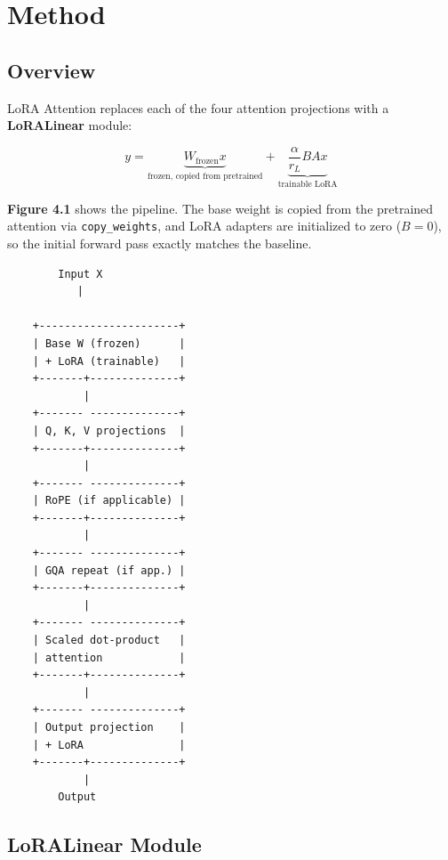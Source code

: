 \section{Method}

\subsection{Overview}

LoRA Attention replaces each of the four attention projections with a 
\textbf{LoRALinear} module:

\[
y = \underbrace{W_\text{frozen} x}_{\text{frozen, copied from pretrained}} + 
    \underbrace{\frac{\alpha}{r_L} B A x}_{\text{trainable LoRA}}
\tag{4.1}
\]

\textbf{Figure 4.1} shows the pipeline. The base weight is copied from the 
pretrained attention via \texttt{copy\_weights}, and LoRA adapters are initialized 
to zero ($B = 0$), so the initial forward pass exactly matches the baseline.

\begin{lstlisting}
        Input X
           |
            
    +----------------------+
    | Base W (frozen)      |
    | + LoRA (trainable)   |
    +-------+--------------+
            |
    +------- --------------+
    | Q, K, V projections  |
    +-------+--------------+
            |
    +------- --------------+
    | RoPE (if applicable) |
    +-------+--------------+
            |
    +------- --------------+
    | GQA repeat (if app.) |
    +-------+--------------+
            |
    +------- --------------+
    | Scaled dot-product   |
    | attention            |
    +-------+--------------+
            |
    +------- --------------+
    | Output projection    |
    | + LoRA               |
    +-------+--------------+
            |
        Output
\end{lstlisting}

\subsection{LoRALinear Module}

